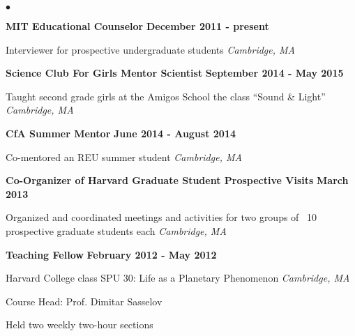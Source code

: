 \documentclass[margin,line]{res}
\newenvironment{list1}{
  \begin{list}{\ding{113}}{%
      \setlength{\itemsep}{0in}
      \setlength{\parsep}{0in} \setlength{\parskip}{0in}
      \setlength{\topsep}{0in} \setlength{\partopsep}{0in} 
      \setlength{\leftmargin}{0.17in}}}{\end{list}}
\newenvironment{list2}{
  \begin{list}{$\bullet$}{%
      \setlength{\itemsep}{0in}
      \setlength{\parsep}{0in} \setlength{\parskip}{0in}
      \setlength{\topsep}{0in} \setlength{\partopsep}{0in} 
      \setlength{\leftmargin}{0.2in}}}{\end{list}}
\begin{document}
\begin{resume}
\begin{list2}
\vspace{0.2in}

\item[] {\bf MIT Educational Counselor} \hfill {\bf December 2011 - present}
\begin{list1}
\item[] Interviewer for prospective undergraduate students \hfill \textit{Cambridge, MA}
\end{list1}

\vspace{0.2in}

\item[] {\bf Science Club For Girls Mentor Scientist} \hfill { \bf September 2014 - May 2015}
\begin{list1}
\item[] Taught second grade girls at the Amigos School the class ``Sound \& Light'' \hfill \textit{Cambridge, MA}
\end{list1}



\vspace{0.2in}

\item[] {\bf CfA Summer Mentor} \hfill {\bf June 2014 - August 2014}
\begin{list1}
\item[] Co-mentored an REU summer student \hfill \textit{Cambridge, MA}
\end{list1}

\vspace{0.2in}

\item[] {\bf Co-Organizer of Harvard Graduate Student Prospective Visits} \hfill {\bf March 2013}
\begin{list1}
\item[] Organized and coordinated meetings and activities for two groups of ~10 prospective graduate students each \hfill \textit{Cambridge, MA}
\end{list1}

\vspace{0.2in}

\item[] {\bf Teaching Fellow} \hfill {\bf February 2012 - May 2012}
\begin{list1}
\item[] Harvard College class SPU 30: Life as a Planetary Phenomenon \hfill \textit{Cambridge, MA}
\item[] Course Head: Prof. Dimitar Sasselov
\item[] Held two weekly two-hour sections
\end{list1}


\end{list2}
\end{resume}
\end{document}

